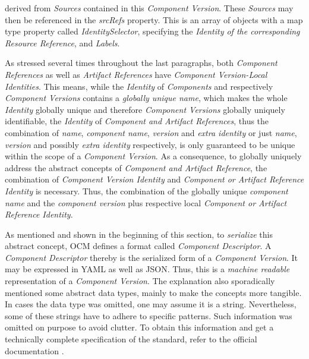derived from \emph{Sources} contained in this \emph{Component Version}. These \emph{Sources} may then be referenced in the \emph{srcRefs} property. This is an array of objects with a map type property called \emph{IdentitySelector}, specifying the \emph{Identity of the corresponding Resource Reference}, and \emph{Labels}.\par
As stressed several times throughout the last paragraphs, both \emph{Component References} as well as \emph{Artifact References} have \emph{Component Version-Local Identities}. This means, while the \emph{Identity} of \emph{Components} and respectively \emph{Component Versions} contains a \emph{globally unique name}, which makes the whole \emph{Identity} globally unique and therefore \emph{Component Versions} globally uniquely identifiable, the \emph{Identity} of \emph{Component and Artifact References}, thus the combination of \emph{name}, \emph{component name}, \emph{version} and \emph{extra identity} or just \emph{name}, \emph{version} and possibly \emph{extra identity} respectively, is only guaranteed to be unique within the scope of a \emph{Component Version}. As a consequence, to globally uniquely address the abstract concepts of \emph{Component and Artifact Reference}, the combination of \emph{Component Version Identity} and \emph{Component or Artifact Reference Identity} is necessary. Thus, the combination of the globally unique \emph{component name} and the \emph{component version} plus respective local \emph{Component or Artifact Reference Identity}.\par
\noindent As mentioned and shown in the beginning of this section, to \emph{serialize} this abstract concept, OCM defines a format called \emph{Component Descriptor}. A \emph{Component Descriptor} thereby is the serialized form of a \emph{Component Version}. It may be expressed in YAML as well as JSON. Thus, this is a \emph{machine readable} representation of a \emph{Component Version}. The explanation also sporadically mentioned some abstract data types, mainly to make the concepts more tangible. In cases the data type was omitted, one may assume it is a string. Nevertheless, some of these strings have to adhere to specific patterns. Such information was omitted on purpose to avoid clutter. To obtain this information and get a technically complete specification of the standard, refer to the official documentation \cite{OCMSpec}.

